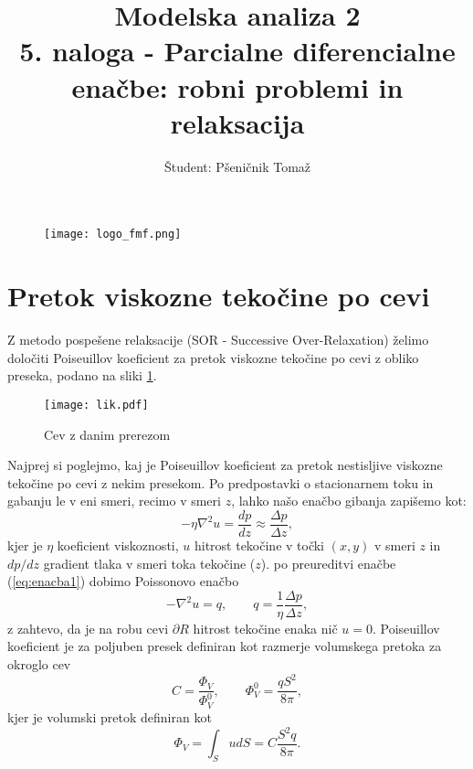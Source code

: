 \documentclass[12pt,a4paper]{article}
\title{\textbf{Modelska analiza 2} \\ 5. naloga - Parcialne diferencialne enačbe: robni problemi in relaksacija \\}
\author{Študent: Pšeničnik Tomaž}
\begin{document}

	\begin{figure} [h]
  \centering
  \texttt{[image: logo\_fmf.png]}
  \maketitle
\end{figure}
	
	
	
	\newpage
	
	
	
\section*{Pretok viskozne tekočine po cevi}

Z metodo pospešene relaksacije (SOR - Successive Over-Relaxation) želimo določiti Poiseuillov koeficient za pretok viskozne tekočine po cevi z obliko preseka, podano na sliki \ref{fig:slika1}.

\begin{figure}[H]
\begin{center}
\texttt{[image: lik.pdf]}
\caption{Cev z danim prerezom} \label{fig:slika1}
\end{center}
\end{figure} 

\noindent Najprej si poglejmo, kaj je Poiseuillov koeficient za pretok nestisljive viskozne tekočine po cevi z nekim presekom. Po predpostavki o stacionarnem toku in gabanju le v eni smeri, recimo v smeri $z$, lahko našo enačbo gibanja zapišemo kot:
\begin{equation} \label{eq:enacba1}
-\eta \nabla ^{2} u = \frac{dp}{dz} \approx \frac{\Delta p}{ \Delta z},
\end{equation}
kjer je $\eta$ koeficient viskoznosti, $u$ hitrost tekočine v točki $(x,y)$ v smeri $z$ in $dp/dz$ gradient tlaka v smeri toka tekočine ($z$). po preureditvi enačbe (\ref{eq:enacba1}) dobimo Poissonovo enačbo
\begin{equation} \label{eq:enacba2}
-\nabla ^{2} u = q, \qquad q = \frac{1}{\eta}\frac{\Delta p}{\Delta z},
\end{equation} 
z zahtevo, da je na robu cevi $\partial R$ hitrost tekočine enaka nič $u=0$. Poiseuillov koeficient je za poljuben presek definiran kot razmerje volumskega pretoka za okroglo cev
\begin{equation}
C= \frac{\Phi_V}{\Phi_V ^{0}}, \qquad \Phi_V ^{0}= \frac{q S^{2}}{8 \pi},
\end{equation}
kjer je volumski pretok definiran kot
\begin{equation}
\Phi _V = \int _S u dS = C\frac{S^{2}q}{8 \pi}.
\end{equation}
\end{document}
